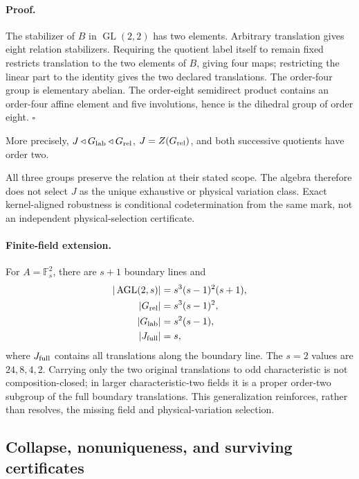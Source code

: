 \paragraph{Proof.}
The stabilizer of \(B\) in \(\operatorname{GL}(2,2)\) has two elements.
Arbitrary translation gives eight relation stabilizers.  Requiring the
quotient label itself to remain fixed restricts translation to the two
elements of \(B\), giving four maps; restricting the linear part to the
identity gives the two declared translations.  The order-four group is
elementary abelian.  The order-eight semidirect product contains an
order-four affine element and five involutions, hence is the dihedral group
of order eight. \(\square\)

More precisely, \(J\triangleleft G_{\rm lab}\triangleleft G_{\rm rel}\),
\(J=Z(G_{\rm rel})\), and both successive quotients have order two.

All three groups preserve the relation at their stated scope.  The algebra
therefore does not select \(J\) as the unique exhaustive or physical
variation class.  Exact kernel-aligned robustness is conditional
codetermination from the same mark, not an independent physical-selection
certificate.

\paragraph{Finite-field extension.}
For \(A=\mathbb F_s^2\), there are \(s+1\) boundary lines and
\[
\begin{aligned}
 |\operatorname{AGL}(2,s)|&=s^3(s-1)^2(s+1),\\
 |G_{\rm rel}|&=s^3(s-1)^2,\\
 |G_{\rm lab}|&=s^2(s-1),\\
 |J_{\rm full}|&=s,
\end{aligned}
\]
where \(J_{\rm full}\) contains all translations along the boundary line.
The \(s=2\) values are \(24,8,4,2\).  Carrying only the two original
translations to odd characteristic is not composition-closed; in larger
characteristic-two fields it is a proper order-two subgroup of the full
boundary translations.  This generalization reinforces, rather than
resolves, the missing field and physical-variation selection.

\subsection{Collapse, nonuniqueness, and surviving certificates}

